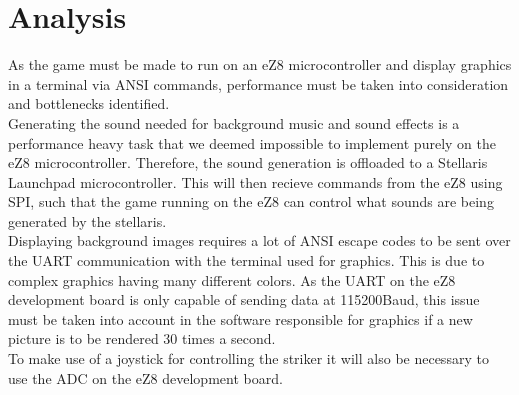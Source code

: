 \section{Analysis}
As the game must be made to run on an eZ8 microcontroller and display graphics in a terminal via ANSI
commands, performance must be taken into consideration and bottlenecks identified. \\

Generating the sound needed for background music and sound effects is a performance heavy task that we deemed
impossible to implement purely on the eZ8 microcontroller.
Therefore, the sound generation is offloaded to a Stellaris Launchpad microcontroller. 
This will then recieve commands from the eZ8 using SPI, such that the game running on the eZ8 can control
what sounds are being generated by the stellaris.\\

Displaying background images requires a lot of ANSI escape codes to be sent over the UART communication with
the terminal used for graphics. This is due to complex graphics having many different colors. As the UART on the eZ8 
development board is only capable of sending data at 115200Baud, this issue must be taken into account
in the software responsible for graphics if a new picture is to be rendered 30 times a second. \\

To make use of a joystick for controlling the striker it will also be necessary to use the ADC on the eZ8 development
board. 





